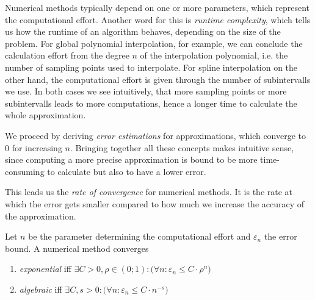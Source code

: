 Numerical methods typically depend on one or more parameters, which represent the computational effort.
Another word for this is \emph{runtime complexity}, which tells us how the runtime of an algorithm behaves, depending on the size of the problem.
For global polynomial interpolation, for example, we can conclude the calculation effort from the degree \(n\) of the interpolation polynomial, i.e. the number of sampling points used to interpolate.
For spline interpolation on the other hand, the computational effort is given through the number of subintervalls we use.
In both cases we see intuitively, that more sampling points or more subintervalls leads to more computations, hence a longer time to calculate the whole approximation.

We proceed by deriving \emph{error estimations} for approximations, which converge to 0 for increasing \(n\).
Bringing together all these concepts makes intuitive sense, since computing a more precise approximation is bound to be more time-consuming to calculate but also to have a lower error.

This leads us the \emph{rate of convergence} for numerical methods.
It is the rate at which the error gets smaller compared to how much we increase the accuracy of the approximation.
\begin{definition}\label{def:num_meth_conv}
   Let \(n\) be the parameter determining the computational effort and \(\varepsilon_n\) the error bound.
   A numerical method converges
   \begin{enumerate}[label=\roman*, align=Center]
      \item \emph{exponential} iff \(\exists C > 0, \rho \in (0;1): \big(\forall n: \varepsilon_n \leq C \cdot \rho^n\big)\)
      \item \emph{algebraic} iff \(\exists C, s > 0: \big(\forall n: \varepsilon_n \leq C \cdot n^{-s}\big)\)
   \end{enumerate}
\end{definition}

\newpage

